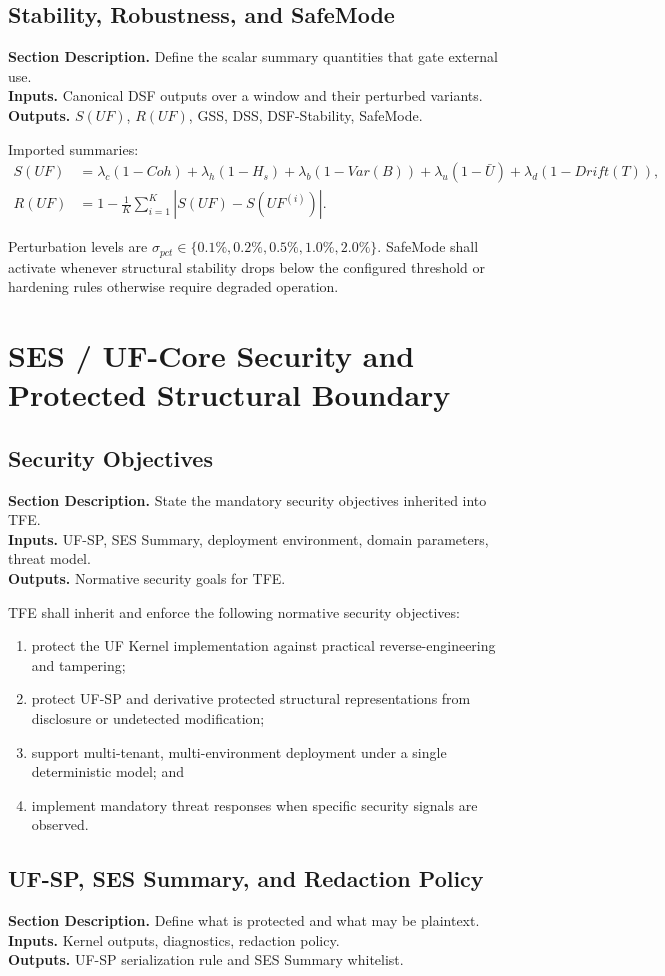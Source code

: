 \documentclass[11pt]{report}
\newcommand{\meta}[3]{\textbf{Section Description.} #1\\
\textbf{Inputs.} #2\\
\textbf{Outputs.} #3\par}
\begin{document}
\section{Stability, Robustness, and SafeMode}
\meta{Define the scalar summary quantities that gate external use.}{Canonical DSF outputs over a window and their perturbed variants.}{$S(UF)$, $R(UF)$, GSS, DSS, DSF-Stability, SafeMode.}

Imported summaries:
\begin{align*}
S(UF) &= \lambda_c(1-Coh)+\lambda_h(1-H_s)+\lambda_b(1-Var(B))+\lambda_u(1-\bar U)+\lambda_d(1-Drift(T)),\\
R(UF) &= 1-\frac{1}{K}\sum_{i=1}^{K}\left|S(UF)-S(UF^{(i)})\right|.
\end{align*}

Perturbation levels are $\sigma_{pct}\in\{0.1\%,0.2\%,0.5\%,1.0\%,2.0\%\}$. SafeMode shall activate whenever structural stability drops below the configured threshold or hardening rules otherwise require degraded operation.

\chapter{SES / UF-Core Security and Protected Structural Boundary}
\section{Security Objectives}
\meta{State the mandatory security objectives inherited into TFE.}{UF-SP, SES Summary, deployment environment, domain parameters, threat model.}{Normative security goals for TFE.}

TFE shall inherit and enforce the following normative security objectives:
\begin{enumerate}[leftmargin=1.2cm]
    \item protect the UF Kernel implementation against practical reverse-engineering and tampering;
    \item protect UF-SP and derivative protected structural representations from disclosure or undetected modification;
    \item support multi-tenant, multi-environment deployment under a single deterministic model; and
    \item implement mandatory threat responses when specific security signals are observed.
\end{enumerate}

\section{UF-SP, SES Summary, and Redaction Policy}
\meta{Define what is protected and what may be plaintext.}{Kernel outputs, diagnostics, redaction policy.}{UF-SP serialization rule and SES Summary whitelist.}
\end{document}
